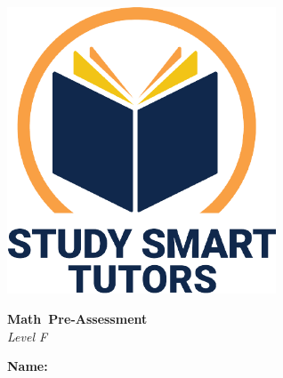 \documentclass[12pt]{article}
\title{}
\date{}
\newcommand{\subject}{Math}
\newcommand{\assessmenttype}{Pre-Assessment}
\newcommand{\levelLetter}{F}
\begin{document}
\thispagestyle{empty}

\vspace*{\fill}

\vspace*{3cm}

\begin{center}

    \includegraphics[width=0.6\textwidth]{SST_Color_Logo.png} %
    
    \vspace{1cm} %
    
    
    \Huge \textbf{\subject \ \assessmenttype }\\ 
     \vspace{1 cm}
      \LARGE \textit{Level \levelLetter}\\[1cm]
 \vspace{0.5cm}
    
   


    \LARGE \textbf{Name:} \underline{\hspace{8cm}}

    
    \vfill %
    
\end{center}


\newpage
\thispagestyle{empty}
\vspace*{\fill}
\newpage


\newpage


\end{document}
